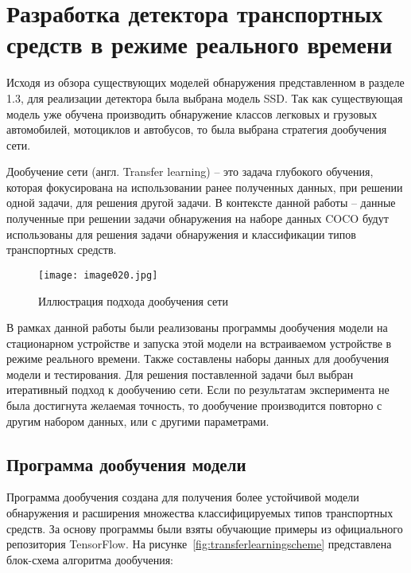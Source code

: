 \chapter{Разработка детектора транспортных средств в режиме реального времени}

Исходя из обзора существующих моделей обнаружения представленном в разделе 1.3, для реализации детектора была выбрана модель SSD. Так как существующая модель уже обучена производить обнаружение классов легковых и грузовых автомобилей, мотоциклов и автобусов, то была выбрана стратегия дообучения сети. 

Дообучение сети (англ. Transfer learning) – это задача глубокого обучения, которая фокусирована на использовании ранее полученных данных, при решении одной задачи, для решения другой задачи. В контексте данной работы – данные полученные при решении задачи обнаружения на наборе данных COCO будут использованы для решения задачи обнаружения и классификации типов транспортных средств.

\begin{figure}[htbp]
\centering
\texttt{[image: image020.jpg]}
\caption{Иллюстрация подхода дообучения сети}%
\label{fig:how-to-do-research}
\end{figure}

В рамках данной работы были реализованы программы дообучения модели на стационарном устройстве и запуска этой модели на встраиваемом устройстве в режиме реального времени. Также составлены наборы данных для дообучения модели и тестирования. Для решения поставленной задачи был выбран итеративный подход к дообучению сети. Если по результатам эксперимента не была достигнута желаемая точность, то дообучение производится повторно с другим набором данных, или с другими параметрами. 

\section{Программа дообучения модели}

Программа дообучения создана для получения более устойчивой модели обнаружения и расширения множества классифицируемых типов транспортных средств. За основу программы были взяты обучающие примеры из официального репозитория TensorFlow\cite{seventeen}. На рисунке~\ref{fig:transferlearningscheme} представлена блок-схема алгоритма дообучения:

